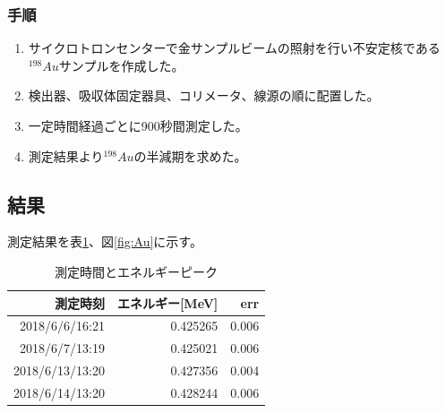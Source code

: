 \documentclass[a4paper,12pt]{jarticle}
\begin{document}
  \subsubsection{手順}
   \begin{enumerate}
    \item サイクロトロンセンターで金サンプルビームの照射を行い不安定核である
    $^{198}Au$サンプルを作成した。
    \item 検出器、吸収体固定器具、コリメータ、線源の順に配置した。
    \item 一定時間経過ごとに900秒間測定した。
    \item 測定結果より$^{198}Au$の半減期を求めた。
   \end{enumerate}

 \subsection{結果}
  測定結果を表\ref{table:3r}、図\ref{fig:Au}に示す。
  \begin{table}[htbp]
   \begin{center}

       \caption{測定時間とエネルギーピーク}
        \begin{tabular}{|r|r|r|}
         \hline
         測定時刻   &  エネルギー[MeV] & err \\
         \hline
         2018/6/6/16:21  & 0.425265 & 0.006  \\
         2018/6/7/13:19  & 0.425021 & 0.006  \\
         2018/6/13/13:20 & 0.427356 & 0.004  \\
         2018/6/14/13:20 & 0.428244 & 0.006  \\
         \hline
        \end{tabular}
       \label{table:3r}

   \end{center}
  \end{table}
\end{document}
